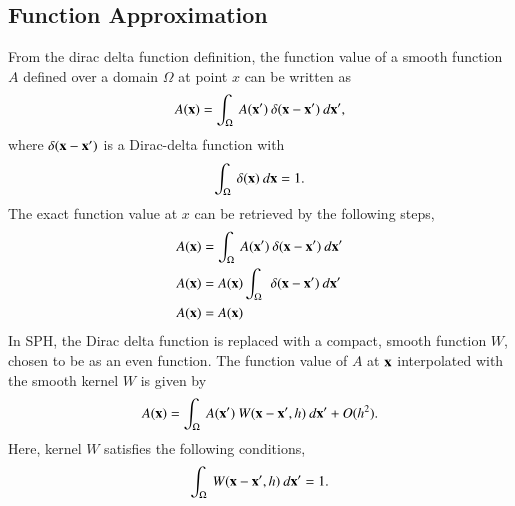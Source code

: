 \subsection{Function Approximation}
From the dirac delta function definition, the function value of a smooth
function $A$ defined over a domain $\Omega$ at point $x$ can be written as
\begin{equation}
  \label{eq:dirac_repr}
  A(\mathbf{x}) = \int_{\Omega}\> A(\mathbf{x}') \> \delta(\mathbf{x} - \mathbf{x}') \> d\mathbf{x}',
\end{equation}
where $\delta(\mathbf{x} - \mathbf{x}')$ is a Dirac-delta function with
\begin{equation}
  \label{eq:unity}
  \int_{\Omega}\> \delta(\mathbf{x}) \> d\mathbf{x} = 1.
\end{equation}
The exact function value at $x$ can be retrieved by the following steps,
\begin{align*}
  \label{eq:dirac_derivation}
  A(\mathbf{x}) &= \int_{\Omega}\> A(\mathbf{x}') \> \delta(\mathbf{x} - \mathbf{x}') \> d\mathbf{x}'\\
  A(\mathbf{x}) &= A(\mathbf{x}) \int_{\Omega}\> \> \delta(\mathbf{x} - \mathbf{x}') \> d\mathbf{x}'\\
  A(\mathbf{x}) &= A(\mathbf{x})
\end{align*}
In SPH, the Dirac delta function is replaced with a compact, smooth function $W$,
chosen to be as an even function. The function value of $A$ at $\mathbf{x}$
interpolated with the smooth kernel $W$ is given by
\begin{equation}
  \label{eq:kernel_repr}
  A(\mathbf{x}) = \int_{\Omega}\> A(\mathbf{x}') \> W(\mathbf{x} - \mathbf{x}', h)  \> d\mathbf{x}' + O(h^2).
\end{equation}
Here, kernel $W$ satisfies the following conditions,
\begin{equation}
  \label{eq:unity}
  \int_{\Omega}\> W(\mathbf{x} - \mathbf{x}', h)  \> d\mathbf{x}' = 1.
\end{equation}

